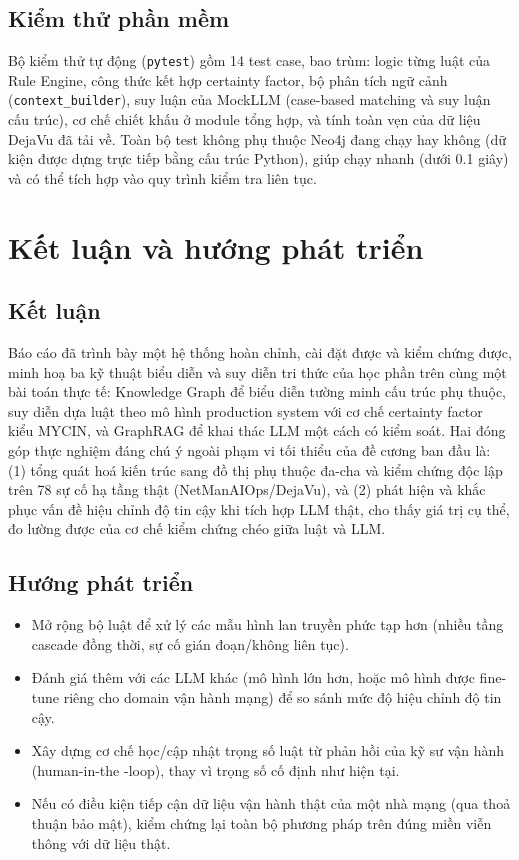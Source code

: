 \documentclass[12pt,a4paper]{report}
\newcommand{\code}[1]{\texttt{\small #1}}
\begin{document}
\section{Kiểm thử phần mềm}

Bộ kiểm thử tự động (\code{pytest}) gồm 14 test case, bao trùm: logic từng luật của Rule Engine,
công thức kết hợp certainty factor, bộ phân tích ngữ cảnh (\code{context\_builder}), suy luận của
MockLLM (case-based matching và suy luận cấu trúc), cơ chế chiết khấu ở module tổng hợp, và tính
toàn vẹn của dữ liệu DejaVu đã tải về. Toàn bộ test không phụ thuộc Neo4j đang chạy hay không (dữ
kiện được dựng trực tiếp bằng cấu trúc Python), giúp chạy nhanh (dưới 0.1 giây) và có thể tích hợp
vào quy trình kiểm tra liên tục.

\chapter{Kết luận và hướng phát triển}

\section{Kết luận}

Báo cáo đã trình bày một hệ thống hoàn chỉnh, cài đặt được và kiểm chứng được, minh hoạ ba kỹ thuật
biểu diễn và suy diễn tri thức của học phần trên cùng một bài toán thực tế: Knowledge Graph để biểu
diễn tường minh cấu trúc phụ thuộc, suy diễn dựa luật theo mô hình production system với cơ chế
certainty factor kiểu MYCIN, và GraphRAG để khai thác LLM một cách có kiểm soát. Hai đóng góp thực
nghiệm đáng chú ý ngoài phạm vi tối thiểu của đề cương ban đầu là: (1) tổng quát hoá kiến trúc sang
đồ thị phụ thuộc đa-cha và kiểm chứng độc lập trên 78 sự cố hạ tầng thật (NetManAIOps/DejaVu), và
(2) phát hiện và khắc phục vấn đề hiệu chỉnh độ tin cậy khi tích hợp LLM thật, cho thấy giá trị cụ
thể, đo lường được của cơ chế kiểm chứng chéo giữa luật và LLM.

\section{Hướng phát triển}

\begin{itemize}
    \item Mở rộng bộ luật để xử lý các mẫu hình lan truyền phức tạp hơn (nhiều tầng cascade đồng
    thời, sự cố gián đoạn/không liên tục).
    \item Đánh giá thêm với các LLM khác (mô hình lớn hơn, hoặc mô hình được fine-tune riêng cho
    domain vận hành mạng) để so sánh mức độ hiệu chỉnh độ tin cậy.
    \item Xây dựng cơ chế học/cập nhật trọng số luật từ phản hồi của kỹ sư vận hành (human-in-the
    -loop), thay vì trọng số cố định như hiện tại.
    \item Nếu có điều kiện tiếp cận dữ liệu vận hành thật của một nhà mạng (qua thoả thuận bảo mật),
    kiểm chứng lại toàn bộ phương pháp trên đúng miền viễn thông với dữ liệu thật.
\end{itemize}
\end{document}
